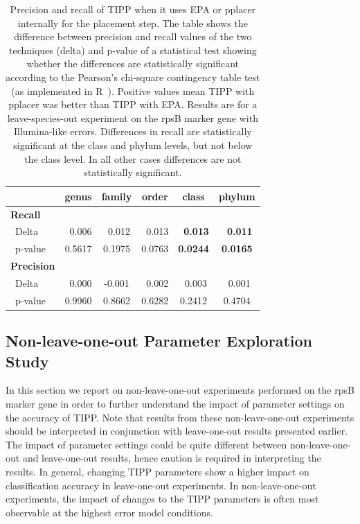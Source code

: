 \begin{table}[hptb]
\caption{\label{tipp:tipp.epa.pplacer.tab} Precision and recall of TIPP when it uses EPA or pplacer internally
for the placement step. The table shows the difference between precision and recall 
values of the two techniques (delta) and p-value of a statistical test showing
whether the differences are statistically significant according to the Pearson's chi-square contingency table test (as implemented in R~\cite{R}).
Positive values mean TIPP with pplacer was better than TIPP with EPA.
Results are for a leave-species-out experiment on the rpsB marker 
gene with Illumina-like errors. 
Differences in recall are
statistically significant at the class and phylum levels, but not
below the class level. In all other cases differences are not statistically significant. }
\begin{center}
\begin{tabular}{|l|c|c|c|c|c|} \hline
&\multicolumn{1}{|c|}{genus}&\multicolumn{1}{c|}{family}&\multicolumn{1}{c|}{order}&\multicolumn{1}{c|}{class}&\multicolumn{1}{c|}{phylum}\\ \hline
{\bf Recall} &&&&&\\
~Delta &~0.006&~0.012&~0.013&{\bf ~0.013}&{\bf ~0.011}\\ 
~p-value &0.5617&0.1975&0.0763&{\bf 0.0244}&{\bf 0.0165}\\ \hline
{\bf Precision} &&&&&\\
~Delta &~0.000&-0.001&~0.002&~0.003&~0.001\\ 
~p-value & 0.9960&0.8662&0.6282&0.2412&0.4704\\ 
\hline
\end{tabular}
\end{center}
\end{table}

\newpage
\subsection{Non-leave-one-out Parameter Exploration Study}\label{supp:tipp_non_leaveout_variants}
In this section we report on non-leave-one-out experiments performed on the rpsB marker gene
in order to further understand the impact of parameter settings on the accuracy of TIPP. Note that results from
these non-leave-one-out experiments should be interpreted in conjunction with
leave-one-out results presented earlier. The impact of parameter settings could
be quite different between non-leave-one-out and leave-one-out results, hence caution is required in interpreting the results. 
In general, changing TIPP parameters show a higher impact on classification accuracy in leave-one-out experiments. 
In non-leave-one-out experiments, the impact of
changes to the TIPP parameters is often most observable at the highest error model conditions.

